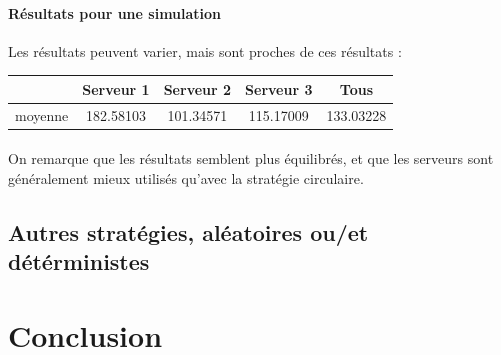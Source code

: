 \documentclass{article}
\begin{document}
\paragraph{Résultats pour une simulation}
Les résultats peuvent varier, mais sont proches de ces résultats :
\begin{center}
	\begin{tabular}{c|ccc|c}
		\hline \hline
		& Serveur 1 & Serveur 2 & Serveur 3 & Tous \\
		\hline
		moyenne & 182.58103 & 101.34571 & 115.17009 & 133.03228 \\
		\hline \hline
	\end{tabular}
\end{center}
\paragraph{}
On remarque que les résultats semblent plus équilibrés, et que les serveurs sont généralement mieux utilisés qu'avec la stratégie circulaire.

\subsection{Autres stratégies, aléatoires ou/et détérministes}

\section{Conclusion}
\paragraph{}

\newpage
\appendix

%
%
\end{document}
